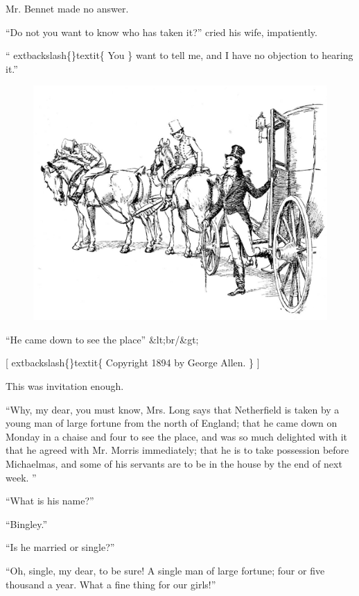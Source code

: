 \documentclass[10pt]{book}
\begin{document}
   Mr. Bennet made no answer.
  

   “Do not you want to know who has taken it?” cried his wife, impatiently.
  

   “
   	extbackslash\{\}textit\{
    You
   \}
   want to tell me, and I have no objection to hearing it.”
  

\begin{figure}[h]
\centering
\includegraphics[width=\linewidth]{images/i_031.jpg}
\end{figure}

     “He came down to see the place”
     &lt;br/&gt;

     [
     	extbackslash\{\}textit\{
      Copyright 1894 by George Allen.
     \}
     ]
    

   This was invitation enough.
  

   “Why, my dear, you must know, Mrs. Long says that Netherfield is taken
by a young man of large fortune from the north of England; that he came
down on Monday in a chaise and four to see the place, and was so much
delighted with it that he agreed with Mr. Morris immediately; that he is
to take possession before Michaelmas, and some of his servants are to be
in the house by the end of next week.
   ”
  

   “What is his name?”
  

   “Bingley.”
  

   “Is he married or single?”
  

   “Oh, single, my dear, to be sure! A single man of large fortune; four or
five thousand a year. What a fine thing for our girls!”
  
\end{document}
